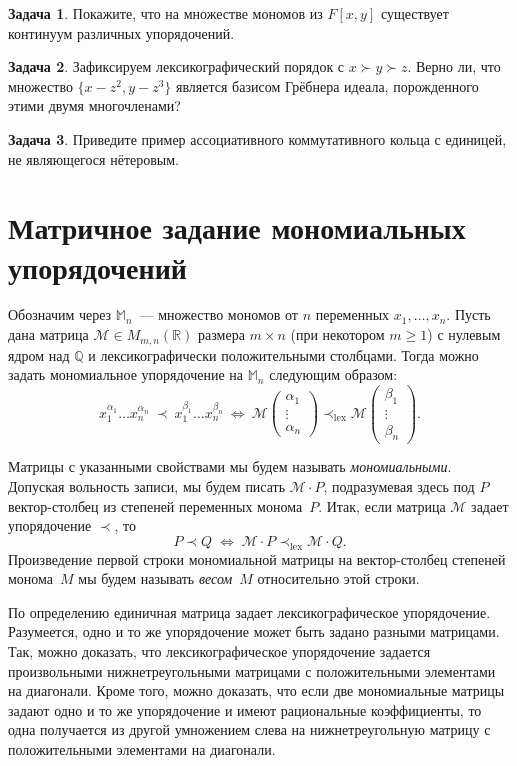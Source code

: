 \documentclass[a4paper,reqno,12pt]{amsart}
\theoremstyle{plain}
\theoremstyle{remark}
\theoremstyle{definition}
\newtheorem{problem}{Задача}[section]
\renewcommand{\ge}{\geqslant}
\DeclareMathOperator{\lex}{lex}
\newcommand{\M} {\mathbb{M}}
\newcommand{\Q}{\mathbb{Q}}
\newcommand{\R}{\mathbb{R}}
\newcommand{\Mat}{\mathcal{M}}
\newcommand{\admOrd}{\prec}
\newcommand{\admOrdG}{\succ}
\begin{document}
\begin{problem}
Покажите, что на множестве мономов из $F[x,y]$ существует континуум различных упорядочений.
\end{problem}

\begin{problem}
Зафиксируем лексикографический порядок с $x \admOrdG y \admOrdG z$.
Верно ли, что множество $\{x - z^2, y - z^3\}$ является базисом Грёбнера идеала, порожденного этими двумя многочленами?
\end{problem}

\begin{problem}
Приведите пример ассоциативного коммутативного кольца с единицей, не являющегося нётеровым.
\end{problem}


\bigskip


\section{Матричное задание мономиальных упорядочений}

Обозначим через $\M_n$~--- множество мономов от $n$ переменных $x_1, \ldots, x_n$.
Пусть дана матрица $\Mat \in M_{m,n} (\R)$ размера ${m \times n}$ (при некотором $m \ge 1$)
с нулевым ядром над $\Q$ и лексикографически положительными столбцами.
Тогда можно задать мономиальное упорядочение на $\M_n$ следующим образом:
$$
 x_1^{\alpha_1} \ldots x_n^{\alpha_n} \:\admOrd\: x_1^{\beta_1} \ldots x_n^{\beta_n} \:
\iff \: \Mat \begin{pmatrix} \alpha_1 \\ \vdots \\ \alpha_n \end{pmatrix} \admOrd_{\lex}
 \Mat \begin{pmatrix} \beta_1 \\ \vdots \\ \beta_n \end{pmatrix}.
$$

Матрицы с указанными свойствами мы будем называть \emph{мономиальными}.
Допуская вольность записи, мы будем писать $\Mat \cdot P$, 
подразумевая здесь под $P$ вектор-столбец из степеней переменных монома~$P$.
Итак, если матрица $\Mat$ задает упорядочение $\admOrd$, то
$$
 P \admOrd Q \; \iff \; \Mat \cdot P \admOrd_{\lex} \Mat \cdot Q.
$$
Произведение первой строки мономиальной матрицы на вектор-столбец степеней монома~$M$
мы будем называть \emph{весом}~$M$ относительно этой строки.

По определению единичная матрица задает лексикографическое упорядочение.
Разумеется, одно и то же упорядочение может быть задано разными матрицами.
Так, можно доказать, что лексикографическое упорядочение
задается произвольными нижнетреугольными матрицами с положительными элементами на диагонали.
Кроме того, можно доказать, что если две мономиальные матрицы задают одно и то же упорядочение и имеют рациональные коэффициенты,
то одна получается из другой умножением слева на нижнетреугольную
матрицу с положительными элементами на диагонали.
\end{document}
